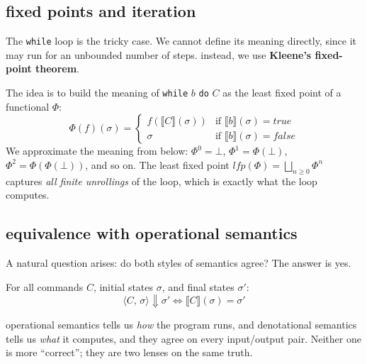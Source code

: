 \subsection{fixed points and iteration}

The \texttt{while} loop is the tricky case. We cannot define its meaning directly, since it may run for an unbounded number of steps. instead, we use \textbf{Kleene's fixed-point theorem}.

The idea is to build the meaning of \texttt{while} $b$ \texttt{do} $C$ as the least fixed point of a functional $\Phi$:
\[
  \Phi(f)(\sigma) =
  \begin{cases}
    f(\llbracket C \rrbracket(\sigma)) & \text{if } \llbracket b
    \rrbracket(\sigma) = \mathit{true} \\
    \sigma & \text{if } \llbracket b \rrbracket(\sigma) =
    \mathit{false}
  \end{cases}
\]
We approximate the meaning from below: $\Phi^0 = \bot$,
$\Phi^1 = \Phi(\bot)$, $\Phi^2 = \Phi(\Phi(\bot))$, and so on. The least fixed point $\mathit{lfp}(\Phi) = \bigsqcup_{n \geq 0} \Phi^n$ captures \emph{all finite unrollings} of the loop, which is exactly what the loop computes.

\subsection{equivalence with operational semantics}

A natural question arises: do both styles of semantics agree? The answer is yes.

\begin{theorem}[Equivalence]
For all commands $C$, initial states $\sigma$, and final states
$\sigma'$:
\[
  \langle C,\, \sigma \rangle \Downarrow \sigma'
  \iff
  \llbracket C \rrbracket(\sigma) = \sigma'
\]
\end{theorem}


operational semantics tells us \emph{how} the program runs, and denotational semantics tells us \emph{what} it computes, and they agree on every input/output pair. Neither one is more ``correct''; they are two lenses on the same truth.




